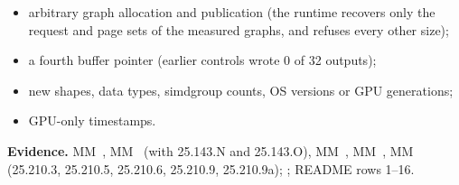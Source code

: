 \begin{itemize}
\item arbitrary graph allocation and publication (the runtime recovers only the request and page sets of the measured
  graphs, and refuses every other size);
\item a fourth buffer pointer (earlier controls wrote 0 of 32 outputs);
\item new shapes, data types, simdgroup counts, OS versions or GPU generations;
\item GPU-only timestamps.
\end{itemize}

\textbf{Evidence.} MM~, MM~ (with 25.143.N and 25.143.O), MM~, MM~, MM~ (25.210.3, 25.210.5,
25.210.6, 25.210.9, 25.210.9a); ; README rows 1–16.
